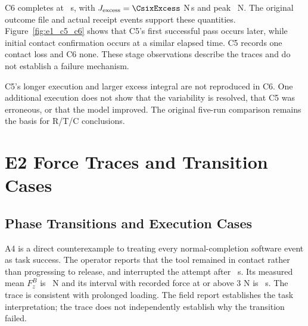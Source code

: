 C6 completes at \CsixTime~s, with \(J_{\mathrm{excess}}=\CsixExcess\) N\,s and peak \CsixPeak~N. The original outcome file and actual receipt events support these quantities. Figure~\ref{fig:e1_c5_c6} shows that C5's first successful pass occurs later, while initial contact confirmation occurs at a similar elapsed time. C5 records one contact loss and C6 none. These stage observations describe the traces and do not establish a failure mechanism.


C5's longer execution and larger excess integral are not reproduced in C6. One additional execution does not show that the variability is resolved, that C5 was erroneous, or that the model improved. The original five-run comparison remains the basis for R/T/C conclusions.


\section{E2 Force Traces and Transition Cases}
\label{app:e2_cases}
\subsection{Phase Transitions and Execution Cases}
A4 is a direct counterexample to treating every normal-completion software event as task success. The operator reports that the tool remained in contact rather than progressing to release, and interrupted the attempt after \AfourInterval~s. Its measured mean \(F_z^B\) is \AfourMeanForce~N and its interval with recorded force at or above 3 N is \AfourContactTime~s. The trace is consistent with prolonged loading. The field report establishes the task interpretation; the trace does not independently establish why the transition failed.


